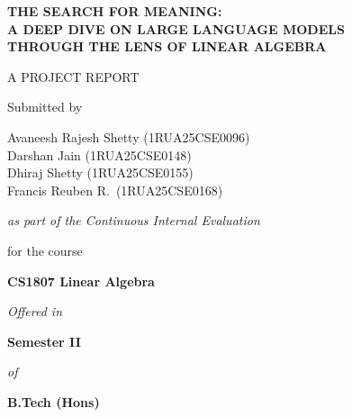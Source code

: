 \documentclass[12pt,a4paper]{article}
\begin{document}
\begin{titlepage}
    \centering
    \vspace*{0.5cm}

    {\Large\bfseries THE SEARCH FOR MEANING:\\
    A DEEP DIVE ON LARGE LANGUAGE MODELS\\
    THROUGH THE LENS OF LINEAR ALGEBRA\par}

    \vspace{0.8cm}

    {\large A PROJECT REPORT\par}

    \vspace{0.8cm}

    {\large Submitted by\par}

    \vspace{0.4cm}

    {\large
    Avaneesh Rajesh Shetty (1RUA25CSE0096)\\
    Darshan Jain (1RUA25CSE0148)\\
    Dhiraj Shetty (1RUA25CSE0155)\\
    Francis Reuben R.\ (1RUA25CSE0168)\par}

    \vspace{0.6cm}

    {\normalsize\itshape as part of the Continuous Internal Evaluation\par}

    \vspace{0.4cm}

    {\normalsize for the course\par}

    \vspace{0.2cm}

    {\large\bfseries CS1807 Linear Algebra\par}

    \vspace{0.4cm}

    {\normalsize\itshape Offered in\par}
    {\large\bfseries Semester II\par}
    {\normalsize\itshape of\par}
    {\large\bfseries B.Tech (Hons)\par}


\end{titlepage}
\end{document}
